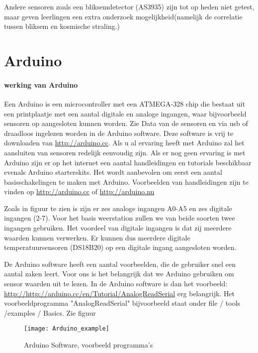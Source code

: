 Andere sensoren zoals een bliksemdetector (AS3935) zijn tot op heden niet getest,
maar geven leerlingen een extra onderzoek mogelijkheid(namelijk de correlatie tussen 
bliksem en kosmische straling.)

\section{Arduino}

\paragraph{werking van Arduino}

Een Arduino is een microcontroller met een ATMEGA-328 chip die bestaat uit 
een printplaatje met een aantal digitale en analoge ingangen, waar bijvoorbeeld  
sensoren op aangesloten kunnen worden. Zie   
Data van de sensoren en via usb of draadloos 
ingelezen worden in de Arduino software. Deze software is vrij te downloaden van
 \url{http://arduino.cc}.
Als u al ervaring heeft met Arduino zal het aansluiten van sensoren redelijk 
eenvoudig zijn. Als er nog geen ervaring is met Arduino zijn er op het internet een 
aantal handleidingen en tutorials beschikbaar evenals Arduino starterskits. 
Het wordt aanbevolen om eerst een aantal basisschakelingen te maken met Arduino.
Voorbeelden van handleidingen zijn te vinden op \url{http://arduino.cc} 
of \url{http://arduino.nu}

Zoals in figuur  te zien is zijn er zes analoge ingangen A0-A5 en
zes digitale ingangen (2-7). Voor het basis weerstation zullen we van beide soorten 
twee ingangen gebruiken.
Het voordeel van digitale ingangen is dat zij meerdere waarden kunnen verwerken.
Er kunnen dus meerdere digitale temperatuursensoren (DS18B20) op een digitale 
ingang aangesloten worden. 

De Arduino software heeft een aantal voorbeelden, die de gebruiker snel een aantal zaken leert.
Voor ons is het belangrijk dat we Arduino gebruiken om sensor waarden uit te lezen.
In de Arduino software is dan het voorbeeld: \url{http://http://arduino.cc/en/Tutorial/AnalogReadSerial} 
erg belangrijk. Het voorbeeldprogramma "AnalogReadSerial" bijvoorbeeld 
staat onder file / tools /examples / Basics.
Zie figuur   

\begin{figure}
    \centering
    \texttt{[image: Arduino\_example]}
    \caption{Arduino Software, voorbeeld programma's}
   \label{fig:Arduino_example}
\end{figure}




